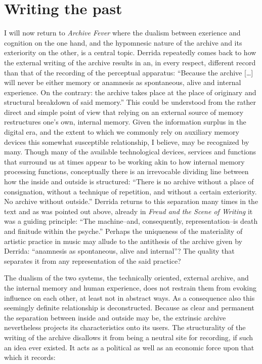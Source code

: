\documentclass[11pt,a4paper]{article}
\begin{document}
\section*{Writing the past}
\label{sec:archive-fever}

I will now return to \emph{Archive Fever} where the dualism between exerience and cognition on the one hand, and the hypomnesic nature of the archive and its exteriority on the other, is a central topic. Derrida repeatedly comes back to how the external writing of the archive results in an, in every respect, different record than that of the recording of the perceptual apparatus: ``Because the archive [\ldots] will never be either memory or anamnesis as spontaneous, alive and internal experience. On the contrary: the archive takes place at the place of originary and structural breakdown of said memory.'' \citep[p. 11]{derrida1998} This could be understood from the rather direct and simple point of view that relying on an external source of memory restructures one's own, internal memory. Given the information surplus in the digital era, and the extent to which we commonly rely on auxiliary memory devices this somewhat susceptible relationship, I believe, may be recognized by many. Though many of the available technological devices, services and functions that surround us at times appear to be working akin to how internal memory processing functions, conceptually there is an irrevocable dividing line between how the inside and outside is structured: ``There is no archive without a place of consignation, without a technique of repetition, and without a certain exteriority. No archive without outside.'' \citep[p. 11]{derrida1998} Derrida returns to this separation many times in the text and as was pointed out above, already in \emph{Freud and the Scene of Writing} it was a guiding principle: ``The machine--and, consequently, representation--is death and finitude within the psyche.'' \citep[p. 286]{der78} Perhaps the uniqueness of the materiality of artistic practice in music may allude to the antithesis of the archive given by Derrida: ``anamnesis as spontaneous, alive and internal''? The quality that separates it from any representation of the said practice?

The dualism of the two systems, the technically oriented, external archive, and the internal memory and human experience, does not restrain them from evoking influence on each other, at least not in abstract ways. As a consequence also this seemingly definite relationship is deconstructed. Because as clear and permanent the separation between inside and outside may be, the extrinsic archive nevertheless projects its characteristics onto its users. The structurality of the writing of the archive disallows it from being a neutral site for recording, if such an idea ever existed. It acts as a political as well as an economic force upon that which it records:
\end{document}
